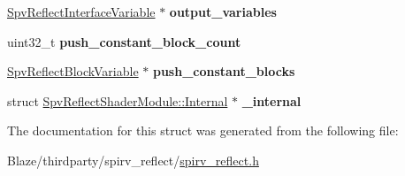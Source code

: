 \begin{DoxyCompactItemize}
\item 
\mbox{\label{structSpvReflectShaderModule_a258fdaa99bace2fd9d9bec8aaffb1c04}} 
\hyperlink{structSpvReflectInterfaceVariable}{Spv\+Reflect\+Interface\+Variable} $\ast$ {\bfseries output\+\_\+variables}
\item 
\mbox{\label{structSpvReflectShaderModule_a0fef2d5f6ff4b43e641d3bf8dbc7551f}} 
uint32\+\_\+t {\bfseries push\+\_\+constant\+\_\+block\+\_\+count}
\item 
\mbox{\label{structSpvReflectShaderModule_a5427562b296f414ef7c7b413b414ad72}} 
\hyperlink{structSpvReflectBlockVariable}{Spv\+Reflect\+Block\+Variable} $\ast$ {\bfseries push\+\_\+constant\+\_\+blocks}
\item 
\mbox{\label{structSpvReflectShaderModule_a384475e8c0f3fad480a42b424298ac05}} 
struct \hyperlink{structSpvReflectShaderModule_1_1Internal}{Spv\+Reflect\+Shader\+Module\+::\+Internal} $\ast$ {\bfseries \+\_\+internal}
\end{DoxyCompactItemize}


The documentation for this struct was generated from the following file\+:\begin{DoxyCompactItemize}
\item 
Blaze/thirdparty/spirv\+\_\+reflect/\hyperlink{spirv__reflect_8h}{spirv\+\_\+reflect.\+h}\end{DoxyCompactItemize}
